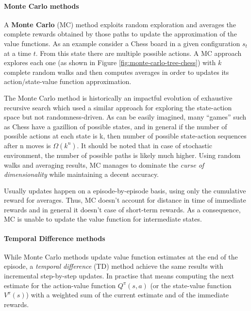 \paragraph{Monte Carlo methods}

A \textbf{Monte Carlo} (MC) \cite{NIPS2014_88bf0c64} method exploits random exploration and averages the complete rewards obtained by those paths to update the approximation of the value functions.
As an example consider a Chess board in a given configuration $s_t$ at a time $t$. From this state there are multiple possible actions. A MC approach explores each one (as shown in Figure \ref{fig:monte-carlo-tree-chess}) with $k$ complete random walks and then computes averages in order to updates its action/state-value function approximation.

The Monte Carlo method is historically an impactful evolution of exhaustive recursive search which used a similar approach for exploring the state-action space but not randomness-driven. As can be easily imagined, many ``games'' such as Chess have a gazillion of possible states, and in general if the number of possible actions at each state is k, then number of possible state-action sequences after n moves is $\Omega(k^n)$. It should be noted that in case of stochastic environment, the number of possible paths is likely much higher. Using random walks and averaging results, MC manages to dominate the \textit{curse of dimensionality} while maintaining a decent accuracy.

Usually updates happen on a episode-by-episode basis, using only the cumulative reward for averages. Thus, MC doesn't account for distance in time of immediate rewards and in general it doesn't case of short-term rewards. As a consequence, MC is unable to update the value function for intermediate states.


\paragraph{Temporal Difference methods}

While Monte Carlo methods update value function estimates at the end of the episode, a \textit{temporal difference} (TD) \cite{sutton1988learning} method achieve the same results with incremental step-by-step updates.
In practise that means computing the next estimate for the action-value function $Q^\pi(s, a)$ (or the state-value function $V^\pi(s)$) with a weighted sum of the current estimate and of the immediate rewards.

